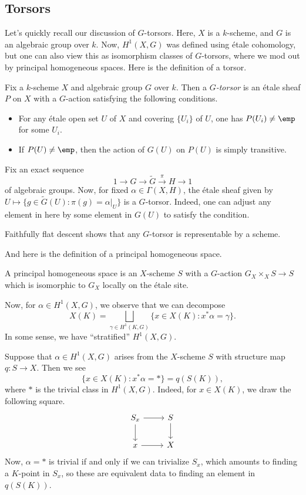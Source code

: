 \documentclass[../notes.tex]{subfiles}
\begin{document}
\subsection{Torsors}
Let's quickly recall our discussion of $G$-torsors. Here, $X$ is a $k$-scheme, and $G$ is an algebraic group over $k$. Now, $H^1(X,G)$ was defined using \'etale cohomology, but one can also view this as isomorphism classes of $G$-torsors, where we mod out by principal homogeneous spaces. Here is the definition of a torsor.
\begin{definition}[torsor]
	Fix a $k$-scheme $X$ and algebraic group $G$ over $k$. Then a \textit{$G$-torsor} is an \'etale sheaf $P$ on $X$ with a $G$-action satisfying the following conditions.
	\begin{itemize}
		\item For any \'etale open set $U$ of $X$ and covering $\{U_i\}$ of $U$, one has $P(U_i)\ne\emp$ for some $U_i$.
		\item If $P(U)\ne\emp$, then the action of $G(U)$ on $P(U)$ is simply transitive.
	\end{itemize}
\end{definition}
\begin{example}
	Fix an exact sequence
	\[1\to G\to\widetilde G\stackrel\pi\to H\to1\]
	of algebraic groups. Now, for fixed $\alpha\in\Gamma(X,H)$, the \'etale sheaf given by $U\mapsto\{g\in\widetilde G(U):\pi(g)=\alpha|_U\}$ is a $G$-torsor. Indeed, one can adjust any element in here by some element in $G(U)$ to satisfy the condition.
\end{example}
\begin{remark}
	Faithfully flat descent shows that any $G$-torsor is representable by a scheme.
\end{remark}
And here is the definition of a principal homogeneous space.
\begin{definition}
	A  principal homogeneous space is an $X$-scheme $S$ with a $G$-action $G_X\times_XS\to S$ which is isomorphic to $G_X$ locally on the \'etale site.
\end{definition}
Now, for $\alpha\in H^1(X,G)$, we observe that we can decompose
\[X(K)=\bigsqcup_{\gamma\in H^1(K,G)}\{x\in X(K):x^*\alpha=\gamma\}.\]
In some sense, we have ``stratified'' $H^1(X,G)$.
\begin{example}
	Suppose that $\alpha\in H^1(X,G)$ arises from the $X$-scheme $S$ with structure map $q\colon S\to X$. Then we see
	\[\{x\in X(K):x^*\alpha=*\}=q(S(K)),\]
	where $*$ is the trivial class in $H^1(X,G)$. Indeed, for $x\in X(K)$, we draw the following square.
	\[\begin{tikzcd}
		{S_x} & S \\
		x & X
		\arrow[from=1-1, to=1-2]
		\arrow[from=1-2, to=2-2]
		\arrow[from=2-1, to=2-2]
		\arrow[from=1-1, to=2-1]
	\end{tikzcd}\]
	Now, $\alpha=*$ is trivial if and only if we can trivialize $S_x$, which amounts to finding a $K$-point in $S_x$, so these are equivalent data to finding an element in $q(S(K))$.
\end{example}
\end{document}
